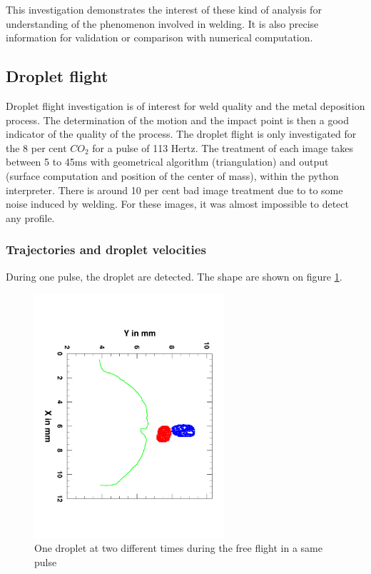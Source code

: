 \documentclass[12pt]{iopart}
\begin{document}
This investigation demonstrates the interest of these kind of analysis for understanding of the phenomenon
involved in welding. It is also precise information for validation or comparison with numerical
computation.

\subsection{ Droplet flight}
Droplet flight investigation is of interest for weld quality and the metal deposition process.
The determination of the motion and the impact point is then a good indicator of the quality of the
process. The droplet flight is only investigated for the 8 per cent $CO_2$ for a pulse of 113 Hertz.
The treatment of each image takes between 5 to 45ms with geometrical algorithm (triangulation) and output
(surface computation and position of the center of mass), within the python interpreter.
There is around  10 per cent bad image treatment  due to to some noise induced by welding. For these
images, it was almost impossible to detect any profile.

\subsubsection{Trajectories and droplet velocities}
During one pulse, the droplet are detected. The shape are shown on figure \ref{fig::droplets}.

\begin{figure}[h!]
\centering    
\includegraphics[width=7cm,angle=90]{images/FreeFlight.pdf}
\caption{One droplet at two different times during the free flight in a same pulse}
\label{fig::droplets}
\end{figure}
\end{document}
